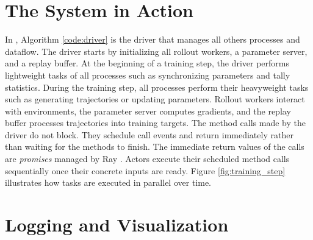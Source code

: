 \section{The \moozi System in Action} \label{sec:driver}
In \moozi, Algorithm \ref{code:driver} is the driver that manages all others processes and dataflow.
The driver starts by initializing all rollout workers, a parameter server, and a replay buffer.
At the beginning of a training step, the driver performs lightweight tasks of all processes such as synchronizing parameters and tally statistics.
During the training step, all processes perform their heavyweight tasks such as generating trajectories or updating parameters.
Rollout workers interact with environments, the parameter server computes gradients, and the replay buffer processes trajectories into training targets.
The method calls made by the driver do not block.
They schedule call events and return immediately rather than waiting for the methods to finish.
The immediate return values of the calls are \textit{promises} managed by Ray \cite{FuturesPromises__2022}.
Actors execute their scheduled method calls sequentially once their concrete inputs are ready.
Figure \ref{fig:training_step} illustrates how tasks are executed in parallel over time.

\section{Logging and Visualization} \label{sec:logging}



